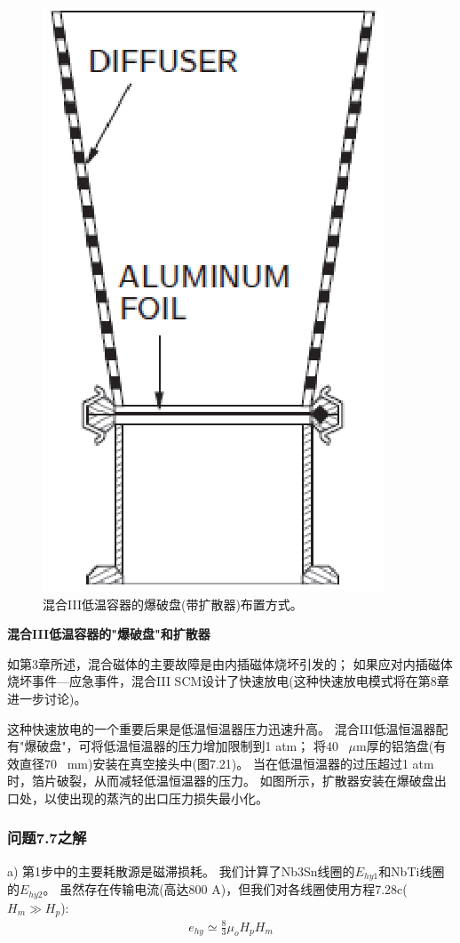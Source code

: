 \begin{figure}[htbp]
	\centering
	\includegraphics[scale=0.7]{chpt7/figs/fig7.21.eps}
	\caption{混合III低温容器的爆破盘(带扩散器)布置方式。}
\end{figure}

\textbf{混合III低温容器的"爆破盘"和扩散器}

如第3章所述，混合磁体的主要故障是由内插磁体烧坏引发的；
如果应对内插磁体烧坏事件---应急事件，混合III SCM设计了快速放电(这种快速放电模式将在第8章进一步讨论)。

这种快速放电的一个重要后果是低温恒温器压力迅速升高。
混合III低温恒温器配有"爆破盘"，可将低温恒温器的压力增加限制到1 atm；
将40~ $\mu$m厚的铝箔盘(有效直径70~ mm)安装在真空接头中(图7.21)。
当在低温恒温器的过压超过1 atm时，箔片破裂，从而减轻低温恒温器的压力。
如图所示，扩散器安装在爆破盘出口处，以使出现的蒸汽的出口压力损失最小化。

\subsubsection{问题7.7之解}
a) 第1步中的主要耗散源是磁滞损耗。 
我们计算了Nb3Sn线圈的$E_{hy1}$和NbTi线圈的$E_{hy2}$。
 虽然存在传输电流(高达800 A)，但我们对各线圈使用方程7.28c($H_m\gg H_p$):
\begin{align*}%
e_{hy}\simeq\frac{8}{3}\mu_oH_pH_m \tag{7.28c}
\end{align*}

